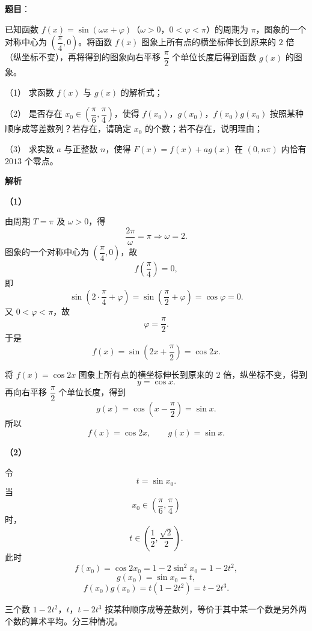 \begin{answer}

\textbf{题目}：

已知函数 $f(x)=\sin(\omega x+\varphi)$（$\omega>0$，$0<\varphi<\pi$）的周期为 $\pi$，图象的一个对称中心为 $\left(\dfrac\pi4,0\right)$。将函数 $f(x)$ 图象上所有点的横坐标伸长到原来的 $2$ 倍（纵坐标不变），再将得到的图象向右平移 $\dfrac\pi2$ 个单位长度后得到函数 $g(x)$ 的图象。

（1） 求函数 $f(x)$ 与 $g(x)$ 的解析式；

（2） 是否存在 $x_0\in\left(\dfrac\pi6,\dfrac\pi4\right)$，使得 $f(x_0)$，$g(x_0)$，$f(x_0)g(x_0)$ 按照某种顺序成等差数列？若存在，请确定 $x_0$ 的个数；若不存在，说明理由；

（3） 求实数 $a$ 与正整数 $n$，使得 $F(x)=f(x)+ag(x)$ 在 $(0,n\pi)$ 内恰有 $2013$ 个零点。

\textbf{解析}

\textbf{（1）}

由周期 $T=\pi$ 及 $\omega>0$，得
\nopagebreak[4]
\[\frac{2\pi}{\omega}=\pi\Longrightarrow\omega=2.\]
图象的一个对称中心为 $\left(\dfrac\pi4,0\right)$，故
\nopagebreak[4]
\[f\left(\frac\pi4\right)=0,\]
即
\nopagebreak[4]
\[\sin\left(2\cdot\frac\pi4+\varphi\right)=\sin\left(\frac\pi2+\varphi\right)=\cos\varphi=0.\]
又 $0<\varphi<\pi$，故
\nopagebreak[4]
\[\varphi=\frac\pi2.\]
于是
\nopagebreak[4]
\[f(x)=\sin\left(2x+\frac\pi2\right)=\cos2x.\]

将 $f(x)=\cos2x$ 图象上所有点的横坐标伸长到原来的 $2$ 倍，纵坐标不变，得到
\nopagebreak[4]
\[y=\cos x.\]
再向右平移 $\dfrac\pi2$ 个单位长度，得到
\nopagebreak[4]
\[g(x)=\cos\left(x-\frac\pi2\right)=\sin x.\]
所以
\nopagebreak[4]
\[f(x)=\cos2x,\qquad g(x)=\sin x.\]

\textbf{（2）}

令
\nopagebreak[4]
\[t=\sin x_0.\]
当
\nopagebreak[4]
\[x_0\in\left(\frac\pi6,\frac\pi4\right)\]
时，
\nopagebreak[4]
\[t\in\left(\frac12,\frac{\sqrt2}{2}\right).\]
此时
\nopagebreak[4]
\[f(x_0)=\cos2x_0=1-2\sin^2x_0=1-2t^2,\]
\nopagebreak[4]
\[g(x_0)=\sin x_0=t,\]
\nopagebreak[4]
\[f(x_0)g(x_0)=t(1-2t^2)=t-2t^3.\]

三个数 $1-2t^2$，$t$，$t-2t^3$ 按某种顺序成等差数列，等价于其中某一个数是另外两个数的算术平均。分三种情况。


\end{answer}
